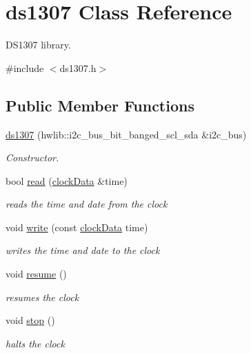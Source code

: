 \hypertarget{classds1307}{}\section{ds1307 Class Reference}
\label{classds1307}


D\+S1307 library.  




{\ttfamily \#include $<$ds1307.\+h$>$}

\subsection*{Public Member Functions}
\begin{DoxyCompactItemize}
\item 
\hyperlink{classds1307_af00b5a28de3652828671373f44cf7472}{ds1307} (hwlib\+::i2c\+\_\+bus\+\_\+bit\+\_\+banged\+\_\+scl\+\_\+sda \&i2c\+\_\+bus)
\begin{DoxyCompactList}\small\item\em Constructor. \end{DoxyCompactList}\item 
bool \hyperlink{classds1307_a7b3ffbaccd65aca8caa241a7fc243849}{read} (\hyperlink{structclockData}{clock\+Data} \&time)
\begin{DoxyCompactList}\small\item\em reads the time and date from the clock \end{DoxyCompactList}\item 
void \hyperlink{classds1307_a8f4da237ebd8ac608e0eabc8e005cac8}{write} (const \hyperlink{structclockData}{clock\+Data} time)
\begin{DoxyCompactList}\small\item\em writes the time and date to the clock \end{DoxyCompactList}\item 
void \hyperlink{classds1307_a4a3381031893e29473b07298b7e453a1}{resume} ()
\begin{DoxyCompactList}\small\item\em resumes the clock \end{DoxyCompactList}\item 
void \hyperlink{classds1307_a1a907663046341c0b4ec1fea2f4e4eb8}{stop} ()
\begin{DoxyCompactList}\small\item\em halts the clock \end{DoxyCompactList}\end{DoxyCompactItemize}


